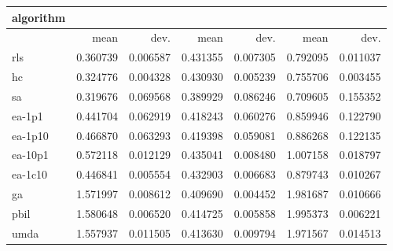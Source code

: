 \begin{tabular}{@{}l*{6}{>{{}}N{1}{2}}@{}}
\toprule
{algorithm} &  &  &  \\
\midrule
& {mean} & {dev.} & {mean} & {dev.} & {mean} & {dev.} \\
\midrule
rls & 0.360739 & 0.006587 & 0.431355 & 0.007305 & 0.792095 & 0.011037 \\
 hc & 0.324776 & 0.004328 & 0.430930 & 0.005239 & 0.755706 & 0.003455 \\
 sa & 0.319676 & 0.069568 & 0.389929 & 0.086246 & 0.709605 & 0.155352 \\
 ea-1p1 & 0.441704 & 0.062919 & 0.418243 & 0.060276 & 0.859946 & 0.122790 \\
 ea-1p10 & 0.466870 & 0.063293 & 0.419398 & 0.059081 & 0.886268 & 0.122135 \\
 ea-10p1 & 0.572118 & 0.012129 & 0.435041 & 0.008480 & 1.007158 & 0.018797 \\
 ea-1c10 & 0.446841 & 0.005554 & 0.432903 & 0.006683 & 0.879743 & 0.010267 \\
 ga & 1.571997 & 0.008612 & 0.409690 & 0.004452 & 1.981687 & 0.010666 \\
 pbil & 1.580648 & 0.006520 & 0.414725 & 0.005858 & 1.995373 & 0.006221 \\
 umda & 1.557937 & 0.011505 & 0.413630 & 0.009794 & 1.971567 & 0.014513 \\
 \bottomrule
\end{tabular}
